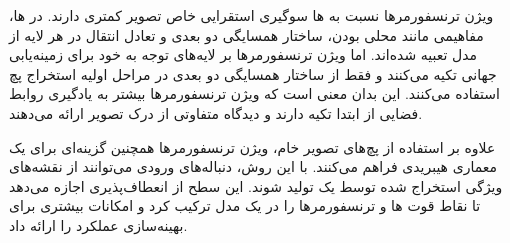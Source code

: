 ویژن ترنسفورمرها نسبت به  ها سوگیری استقرایی خاص تصویر کمتری دارند. در  ها، مفاهیمی مانند محلی بودن، ساختار همسایگی دو بعدی و تعادل انتقال در هر لایه از مدل تعبیه شده‌اند. اما ویژن ترنسفورمرها بر لایه‌های توجه به خود برای زمینه‌یابی جهانی تکیه می‌کنند و فقط از ساختار همسایگی دو بعدی در مراحل اولیه استخراج پچ استفاده می‌کنند. این بدان معنی است که ویژن ترنسفورمرها بیشتر به یادگیری روابط فضایی از ابتدا تکیه دارند و دیدگاه متفاوتی از درک تصویر ارائه می‌دهند.


علاوه بر استفاده از پچ‌های تصویر خام، ویژن ترنسفورمرها همچنین گزینه‌ای برای یک معماری هیبریدی فراهم می‌کنند. با این روش، دنباله‌های ورودی می‌توانند از نقشه‌های ویژگی استخراج شده توسط یک  تولید شوند. این سطح از انعطاف‌پذیری اجازه می‌دهد تا نقاط قوت  ها و ترنسفورمرها را در یک مدل ترکیب کرد و امکانات بیشتری برای بهینه‌سازی عملکرد را ارائه داد.























